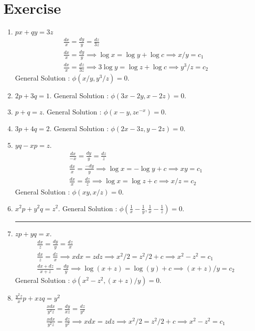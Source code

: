 \section*{Exercise}
\begin{enumerate}
	\item $px + qy = 3z$
	\begin{align*}
		& \frac{dx}{x} = \frac{dy}{y} = \frac{dz}{3z}\\
		& \frac{dx}{x} = \frac{dy}{y} \implies \log x = \log y + \log c \implies x/y = c_1 \\
		& \frac{dx}{x} = \frac{dz}{3z} \implies 3\log y = \log z + \log c \implies y^3/z = c_2
	\end{align*}
		General Solution : $\phi(x/y,y^3/z) = 0$.
	\item $2p + 3q = 1$.
		General Solution : $\phi(3x-2y,x-2z) = 0$.
	\item $p+q = z$.
		General Solution : $\phi(x-y,ze^{-x}) = 0$.
	\item $3p+4q = 2$.
		General Solution : $\phi(2x-3z,y-2z) = 0$.
	\item $yq - xp = z$.
		\begin{align*}
			& \frac{dx}{-x} = \frac{dy}{y} = \frac{dz}{z} \\
			& \frac{dx}{x} = \frac{-dy}{y} \implies \log x = -\log y + c \implies xy = c_1 \\
			& \frac{dx}{x} = \frac{dz}{z} \implies \log x = \log z + c \implies x/z = c_2
		\end{align*}
		General Solution : $\phi(xy,x/z) = 0$.
	\item $x^2p + y^2q = z^2$.
		General Solution : $\phi(\frac{1}{x}-\frac{1}{y},\frac{1}{x}-\frac{1}{z}) = 0$.
		\hrule
	\item $zp + yq = x$.
	\begin{align*}
		& \frac{dx}{z} = \frac{dy}{y} = \frac{dz}{x} \\
		& \frac{dx}{z} = \frac{dz}{x} \implies xdx = zdz \implies x^2/2 = z^2/2 +c \implies x^2-z^2 = c_1\\
		& \frac{dx+dz}{x+z} = \frac{dy}{y} \implies \log(x+z) = \log(y)+c \implies (x+z)/y = c_2
	\end{align*}
		General Solution : $\phi(x^2-z^2,(x+z)/y) = 0$.
	\item $\frac{y^2z}{x}p + xzq = y^2$
		\begin{align*}
			& \frac{xdx}{y^2z} = \frac{dy}{xz} = \frac{dz}{y^2} \\
			& \frac{xdx}{y^2z} = \frac{dz}{y^2} \implies xdx = zdz \implies x^2/2 = z^2/2 + c \implies x^2-z^2 = c_1 \\

\end{align*}
\end{enumerate}
